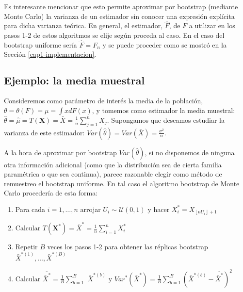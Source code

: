 \documentclass[]{book}
\theoremstyle{definition}
\theoremstyle{definition}
\theoremstyle{definition}
\theoremstyle{remark}
\begin{document}
Es interesante mencionar que esto permite aproximar por bootstrap
(mediante Monte Carlo) la varianza de un estimador sin conocer una
expresión explícita para dicha varianza teórica. En general, el
estimador, \(\hat{F}\), de \(F\) a utilizar en los pasos 1-2 de estos
algoritmos se elije según proceda al caso. En el caso del bootstrap
uniforme sería \(\hat{F}=F_n\) y se puede proceder como se mostró en la
Sección \ref{cap1-implementacion}.

\subsection{Ejemplo: la media muestral}\label{ejemplo-la-media-muestral}

Consideremos como parámetro de interés la media de la población,
\(\theta =\theta \left( F \right) =\mu =\int xdF\left( x \right)\), y
tomemos como estimador la media muestral:
\(\hat{\theta}=\hat{\mu}=T\left( \mathbf{X} \right) =\bar{X}=\frac{1}{n}\sum_{j=1}^{n}X_j\).
Supongamos que deseamos estudiar la varianza de este estimador:
\(Var\left( \hat{\theta} \right) =Var\left( \bar{X} \right) =\frac{\sigma^2}{n}\).

A la hora de aproximar por bootstrap \(Var\left( \hat{\theta} \right)\),
si no disponemos de ninguna otra información adicional (como que la
distribución sea de cierta familia paramétrica o que sea continua),
parece razonable elegir como método de remuestreo el bootstrap uniforme.
En tal caso el algoritmo bootstrap de Monte Carlo procedería de esta
forma:

\begin{enumerate}
\def\labelenumi{\arabic{enumi}.}
\item
  Para cada \(i=1,\ldots ,n\) arrojar
  \(U_i\sim \mathcal{U}\left( 0,1 \right)\) y hacer
  \(X_i^{\ast}=X_{\left\lfloor nU_i\right\rfloor +1}\)
\item
  Calcular
  \(T\left( \mathbf{X}^{\ast} \right) =\bar{X}^{\ast}= \frac{1}{n}\sum_{i=1}^{n}X_i^{\ast}\)
\item
  Repetir \(B\) veces los pasos 1-2 para obtener las réplicas bootstrap
  \(\bar{X}^{\ast (1)}, \ldots, \bar{X}^{\ast (B)}\)
\item
  Calcular \(\overline{\bar{X}^{\ast}}=\frac{1}{B}\sum_{b=1}^{B}\)
  \(\bar{X}^{\ast (b)}\) y
  \(Var^{\ast}\left( \bar{X}^{\ast} \right) =\frac{1}{B} \sum_{b=1}^{B}\left( \bar{X}^{\ast (b)}-\overline{\bar{X}^{\ast}} \right)^2\)
\end{enumerate}
\end{document}
